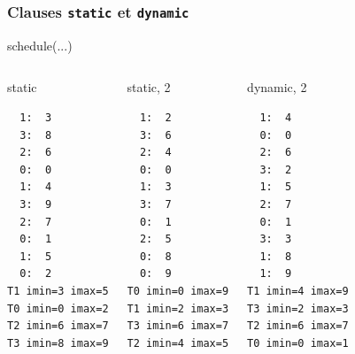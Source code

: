 \documentclass{beamer}
\begin{document}
\begin{frame}[fragile]
  \frametitle{Clauses {\tt static} et {\tt dynamic}}


  schedule(...)

  \footnotesize

\begin{columns}[t]
  \column[T]{3cm}
  

  \begin{block}{static}
\begin{verbatim}
  1:  3
  3:  8
  2:  6
  0:  0
  1:  4
  3:  9
  2:  7
  0:  1
  1:  5
  0:  2
T1 imin=3 imax=5
T0 imin=0 imax=2
T2 imin=6 imax=7
T3 imin=8 imax=9
\end{verbatim}
  \end{block}

  \column[T]{3cm}
  \begin{block}{static, 2}
\begin{verbatim}
  1:  2
  3:  6
  2:  4
  0:  0
  1:  3
  3:  7
  0:  1
  2:  5
  0:  8
  0:  9
T0 imin=0 imax=9
T1 imin=2 imax=3
T3 imin=6 imax=7
T2 imin=4 imax=5
\end{verbatim}
  \end{block}  


  \column[T]{3cm}
  \begin{block}{dynamic, 2}
\begin{verbatim} 
  1:  4
  0:  0
  2:  6
  3:  2
  1:  5
  2:  7
  0:  1
  3:  3
  1:  8
  1:  9
T1 imin=4 imax=9
T3 imin=2 imax=3
T2 imin=6 imax=7
T0 imin=0 imax=1
\end{verbatim}
  \end{block}  



\end{columns}
\normalsize  
\end{frame}
\end{document}
